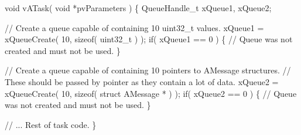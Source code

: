 \begin{DoxyPre}void vATask( void *pvParameters )
\{
QueueHandle\_t xQueue1, xQueue2;\end{DoxyPre}



\begin{DoxyPre}   // Create a queue capable of containing 10 uint32\_t values.
   xQueue1 = xQueueCreate( 10, sizeof( uint32\_t ) );
   if( xQueue1 == 0 )
   \{
    // Queue was not created and must not be used.
   \}\end{DoxyPre}



\begin{DoxyPre}   // Create a queue capable of containing 10 pointers to AMessage structures.
   // These should be passed by pointer as they contain a lot of data.
   xQueue2 = xQueueCreate( 10, sizeof( struct AMessage * ) );
   if( xQueue2 == 0 )
   \{
    // Queue was not created and must not be used.
   \}\end{DoxyPre}



\begin{DoxyPre}   // ... Rest of task code.
\}
\end{DoxyPre}
 